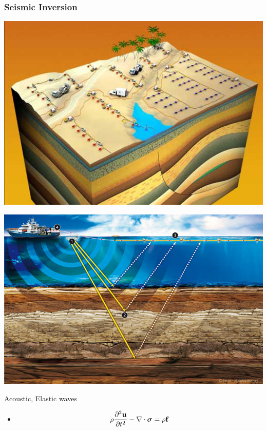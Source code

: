 \documentclass[handout]{beamer}
{
\usepackage{fullpage}
\usepackage{hyperref}
\usepackage{amssymb} 
}
\newcommand{\pder}[2]{\frac{\partial #1}{\partial #2}}
\def \f{{\bf f}}
\def \u{{\bf u}}
\begin{document}
\begin{frame}
\frametitle{Seismic Inversion}
  \begin{center}
   \begin{minipage}{0.45\textwidth}
   \includegraphics[width=\textwidth]{figures/scorpion_landscape.jpg}
   \end{minipage}
   \hfill
   \begin{minipage}{0.45\textwidth}
   \includegraphics[height=0.7\textwidth, width=\textwidth]{figures/MarineSeismic.jpg}
   \end{minipage}
   \vfill
   \begin{minipage}{0.45\textwidth}
   \scriptsize{
   \begin{block}{Acoustic, Elastic waves}
   \begin{itemize}
   \item[] $$\rho \pder{^2 \u}{t^2} - \nabla \cdot \boldsymbol{\sigma} = \rho \f $$

\end{itemize}
\end{block}}
\end{minipage}
\end{center}
\end{frame}
\end{document}
